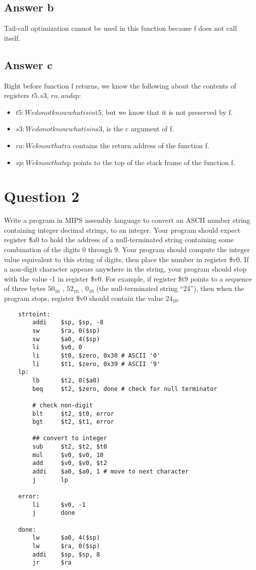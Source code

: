 \documentclass{article}
\begin{document}
\subsection{Answer b}
    Tail-call optimization cannot be used in this function because f does not call itself.

\subsection{Answer c}
    Right before function f returns, we know the following about the contents of registers $t5, $s3, $ra, and $sp:
    \begin{itemize}
        \item $t5: We do not know what is in $t5, but we know that it is not preserved by f.
        \item $s3: We do not know what is in $s3, is the c argument of f.
        \item $ra: We know that $ra contains the return address of the function f.
        \item $sp: We know that $sp points to the top of the stack frame of the function f.
    \end{itemize}

\section{Question 2}
Write a program in MIPS assembly language to convert an ASCII number string containing integer
decimal strings, to an integer. Your program should expect register \$a0 to hold the address of a
null-terminated string containing some combination of the digits 0 through 9. Your program should
compute the integer value equivalent to this string of digits, then place the number in register \$v0.
If a non-digit character appears anywhere in the string, your program should stop with the value -1
in register \$v0. For example, if register \$t9 points to a sequence of three bytes $50_{10}$ , $52_{10}$ , $0_{10}$ (the
null-terminated string “24”), then when the program stops, register \$v0 should contain the value
$24_{10}$.

\begin{verbatim}
    strtoint:
        addi    $sp, $sp, -8
        sw      $ra, 0($sp)
        sw      $a0, 4($sp)
        li      $v0, 0
        li      $t0, $zero, 0x30 # ASCII '0'
        li      $t1, $zero, 0x39 # ASCII '9'
    lp:
        lb      $t2, 0($a0)
        beq     $t2, $zero, done # check for null terminator

        # check non-digit
        blt     $t2, $t0, error 
        bgt     $t2, $t1, error

        ## convert to integer
        sub     $t2, $t2, $t0
        mul     $v0, $v0, 10
        add     $v0, $v0, $t2
        addi    $a0, $a0, 1 # move to next character
        j       lp

    error:
        li      $v0, -1
        j       done

    done:
        lw      $a0, 4($sp)
        lw      $ra, 0($sp)
        addi    $sp, $sp, 8
        jr      $ra
\end{verbatim}
\end{document}
